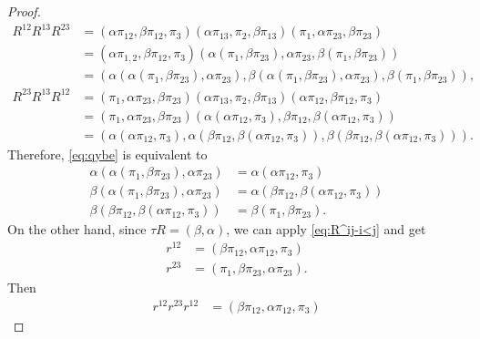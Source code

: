 \begin{proof}
    \begin{align*}
        R^{12}R^{13}R^{23} &= (\alpha\pi_{12},\beta\pi_{12},\pi_3)
                (\alpha\pi_{13},\pi_2,\beta\pi_{13})
                (\pi_1,\alpha\pi_{23},\beta\pi_{23})\\
            &= (\alpha\pi_{1,2},\beta\pi_{12},\pi_3)
                (\alpha(\pi_1,\beta\pi_{23})
                ,\alpha\pi_{23}
                ,\beta(\pi_1,\beta\pi_{23}))\\
            &= (\alpha(\alpha(\pi_1,\beta\pi_{23}),\alpha\pi_{23})
                ,\beta(\alpha(\pi_1,\beta\pi_{23}),\alpha\pi_{23})
                ,\beta(\pi_1,\beta\pi_{23})),\\
        R^{23}R^{13}R^{12} &= (\pi_1,\alpha\pi_{23},\beta\pi_{23})
                (\alpha\pi_{13},\pi_2,\beta\pi_{13})
                (\alpha\pi_{12},\beta\pi_{12},\pi_3)\\
            &= (\pi_1,\alpha\pi_{23},\beta\pi_{23})
                (\alpha(\alpha\pi_{12},\pi_3)
                ,\beta\pi_{12}
                ,\beta(\alpha\pi_{12},\pi_3))\\
            &= (\alpha(\alpha\pi_{12},\pi_3)
                ,\alpha(\beta\pi_{12},\beta(\alpha\pi_{12},\pi_3))
                ,\beta(\beta\pi_{12},\beta(\alpha\pi_{12},\pi_3))).
    \end{align*}
    Therefore, \eqref{eq:qybe} is equivalent to
    \begin{align}\label{eq:qybe-no-flip}
        \alpha(\alpha(\pi_1,\beta\pi_{23}),\alpha\pi_{23})
            &= \alpha(\alpha\pi_{12},\pi_3)\nonumber\\
        \beta(\alpha(\pi_1,\beta\pi_{23}),\alpha\pi_{23})
            &= \alpha(\beta\pi_{12},\beta(\alpha\pi_{12},\pi_3))\\
        \beta(\beta\pi_{12},\beta(\alpha\pi_{12},\pi_3))
            &= \beta(\pi_1,\beta\pi_{23}).\nonumber
    \end{align}
    On the other hand, since $\tau R=(\beta,\alpha)$, we can apply \eqref{eq:R^ij-i<j} and get
    \begin{align*}
        r^{12} &= (\beta\pi_{12},\alpha\pi_{12},\pi_3)\\
        r^{23} &= (\pi_1,\beta\pi_{23},\alpha\pi_{23}).
    \end{align*}
    Then
    \begin{align*}
        r^{12}r^{23}r^{12} &= (\beta\pi_{12},\alpha\pi_{12},\pi_3)

\end{align*}
\end{proof}
